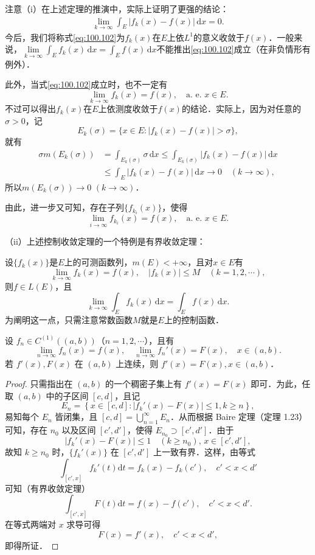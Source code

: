 \documentclass[../../main.tex]{subfiles}
\begin{document}
\begin{remark}
注意（i）在上述定理的推演中，实际上证明了更强的结论：
\begin{align}
\lim_{k \to \infty} \int_E |f_k(x) - f(x)| \, \mathrm{d}x = 0. \label{eq:100.102}
\end{align}
今后，我们将称式\eqref{eq:100.102}为\(f_k(x)\)在\(E\)上依\(L^1\)的意义收敛于\(f(x)\)．一般来说，$\underset{k\rightarrow \infty}{\lim}\int_E{f_k(x)\,\mathrm{d}x}=\int_E{f(x)\,\mathrm{d}x}$不能推出\eqref{eq:100.102}成立（在非负情形有例外）．

此外，当式\eqref{eq:100.102}成立时，也不一定有
\[
\lim_{k \to \infty} f_k(x) = f(x), \quad \text{a. e. } x \in E.
\]
不过可以得出\(f_k(x)\)在\(E\)上依测度收敛于\(f(x)\)的结论．实际上，因为对任意的\(\sigma > 0\)，记
\[
E_k(\sigma) = \{ x \in E : |f_k(x) - f(x)| > \sigma \},
\]
就有
\begin{align*}
\sigma m(E_k(\sigma)) &= \int_{E_k(\sigma)} \sigma \, \mathrm{d}x \leqslant \int_{E_k(\sigma)} |f_k(x) - f(x)| \, \mathrm{d}x \\
&\leqslant \int_E |f_k(x) - f(x)| \, \mathrm{d}x \to 0 \quad (k \to \infty),
\end{align*}
所以\(m(E_k(\sigma)) \to 0\) \((k \to \infty)\)．

由此，进一步又可知，存在子列\(\{ f_{k_i}(x) \}\)，使得
\[
\lim_{i \to \infty} f_{k_i}(x) = f(x), \quad \text{a. e. } x \in E.
\]

（ii）上述控制收敛定理的一个特例是有界收敛定理：

设\(\{ f_k(x) \}\)是\(E\)上的可测函数列，\(m(E) < +\infty\)，且对\(x \in E\)有
\[
\lim_{k \to \infty} f_k(x) = f(x), \quad |f_k(x)| \leqslant M \quad (k = 1, 2, \cdots),
\]
则\(f \in L(E)\)，且
\[
\lim_{k \to \infty} \int_E f_k(x) \, \mathrm{d}x = \int_E f(x) \, \mathrm{d}x.
\]
为阐明这一点，只需注意常数函数\(M\)就是\(E\)上的控制函数．
\end{remark}

\begin{example}
设 \( f_n \in C^{(1)}((a,b)) \)（\( n = 1,2,\cdots \)），且有
\[
\lim_{n \to \infty} f_n(x) = f(x), \quad \lim_{n \to \infty} f_n'(x) = F(x), \quad x \in (a,b).
\]
若 \( f'(x), F(x) \) 在 \( (a,b) \) 上连续，则 \( f'(x) = F(x), x \in (a,b) \)．
\end{example}
\begin{proof}
只需指出在 \( (a,b) \) 的一个稠密子集上有 \( f'(x) = F(x) \) 即可．为此，任取 \( (a,b) \) 中的子区间 \( [c,d] \)，且记
\[
E_n = \left\{ x \in [c,d] : |f_k'(x) - F(x)| \leqslant 1, k \geqslant n \right\},
\]
易知每个 \( E_n \) 皆闭集，且 \( [c,d] = \bigcup_{n=1}^{\infty} E_n \)．从而根据 Baire 定理（定理 1.23）可知，存在 \( n_0 \) 以及区间 \( [c',d'] \)，使得 \( E_{n_0} \supset [c',d'] \)．由于
\[
|f_k'(x) - F(x)| \leqslant 1 \quad (k \geqslant n_0), \, x \in [c',d'],
\]
故知 \( k \geqslant n_0 \) 时，\( \{ f_k'(x) \} \) 在 \( [c',d'] \) 上一致有界．这样，由等式
\[
\int_{[c',x]} f_k'(t) \mathrm{d}t = f_k(x) - f_k(c'), \quad c' < x < d'
\]
可知（有界收敛定理）
\[
\int_{[c',x]} F(t) \mathrm{d}t = f(x) - f(c'), \quad c' < x < d'.
\]
在等式两端对 \( x \) 求导可得
\[
F(x) = f'(x), \quad c' < x < d',
\]
即得所证．
\end{proof}
\end{document}
